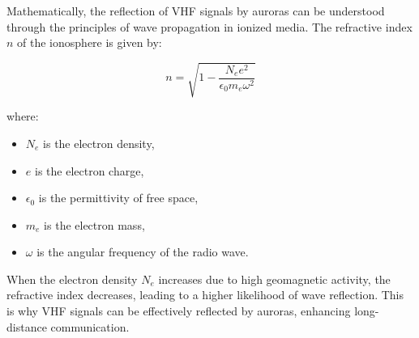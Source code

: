 Mathematically, the reflection of VHF signals by auroras can be understood through the principles of wave propagation in ionized media. The refractive index \( n \) of the ionosphere is given by:

\[
n = \sqrt{1 - \frac{N_e e^2}{\epsilon_0 m_e \omega^2}}
\]

where:
\begin{itemize}
    \item \( N_e \) is the electron density,
    \item \( e \) is the electron charge,
    \item \( \epsilon_0 \) is the permittivity of free space,
    \item \( m_e \) is the electron mass,
    \item \( \omega \) is the angular frequency of the radio wave.
\end{itemize}

When the electron density \( N_e \) increases due to high geomagnetic activity, the refractive index decreases, leading to a higher likelihood of wave reflection. This is why VHF signals can be effectively reflected by auroras, enhancing long-distance communication.


